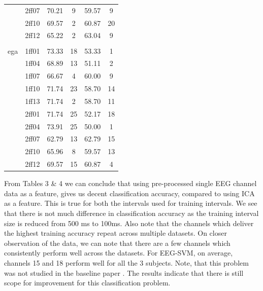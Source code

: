 \documentclass{article} %
\begin{document}
\begin{table}[t]
\begin{center}
\begin{tabular}{c|c|cc|cc}
			&2ff07 &70.21 &9 &59.57 &9 \\
			&2ff10 &69.57 &2 &60.87 &20 \\
			&2ff12 &65.22 &2 &63.04 &9 \\
			\hline \\
			ega &1ff01 &73.33 &18 &53.33 &1 \\
			&1ff04 &68.89 &13 &51.11 &2 \\
			&1ff07 &66.67 &4 &60.00 &9 \\
			&1ff10 &71.74 &23 &58.70 &14 \\
			&1ff13 &71.74 &2 &58.70 &11 \\
			&2ff01 &71.74 &25 &52.17 &18 \\
			&2ff04 &73.91 &25 &50.00 &1 \\
			&2ff07 &62.79 &13 &62.79 &15 \\
			&2ff10 &65.96 &8 &59.57 &13 \\
			&2ff12 &69.57 &15 &60.87 &4 \\
			\hline              
			
		\end{tabular}
	\end{center}
\end{table}

From Tables 3 \& 4 we can conclude that using pre-processed single EEG channel data as a feature, gives us decent classification accuracy, compared to using ICA as a feature. This is true for both the intervals used for training intervals. We see that there is not much difference in classification accuracy as the training interval size is reduced from 500 ms to 100ms. Also note that the channels which deliver the highest training accuracy repeat across multiple datasets. On closer observation of the data, we can note that there are a few channels which consistently perform well across the datasets. For EEG-SVM, on average, channels 15 and 18 perform well for all the 3 subjects. Note, that this problem was not studied in the baseline paper \cite{Stewart20141}. The results indicate that there is still scope for improvement for this classification problem. 
\end{document}

